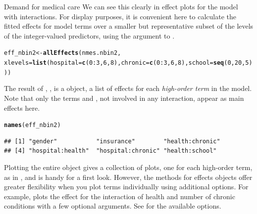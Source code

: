 \documentclass[11pt]{book}\usepackage[]{graphicx}\usepackage[]{color}
\makeatletter
\newcommand{\hlnum}[1]{\textcolor[rgb]{0.686,0.059,0.569}{#1}}%
\newcommand{\hlopt}[1]{\textcolor[rgb]{0,0,0}{#1}}%
\newcommand{\hlstd}[1]{\textcolor[rgb]{0.345,0.345,0.345}{#1}}%
\newcommand{\hlkwb}[1]{\textcolor[rgb]{0.69,0.353,0.396}{#1}}%
\newcommand{\hlkwc}[1]{\textcolor[rgb]{0.333,0.667,0.333}{#1}}%
\newcommand{\hlkwd}[1]{\textcolor[rgb]{0.737,0.353,0.396}{\textbf{#1}}}%
\newenvironment{kframe}{%
 \def\at@end@of@kframe{}%
 \ifinner\ifhmode%
  \def\at@end@of@kframe{\end{minipage}}%
  \begin{minipage}{\columnwidth}%
 \fi\fi%
 \def\FrameCommand##1{\hskip\@totalleftmargin \hskip-\fboxsep
 \colorbox{shadecolor}{##1}\hskip-\fboxsep
     \hskip-\linewidth \hskip-\@totalleftmargin \hskip\columnwidth}%
 \MakeFramed {\advance\hsize-\width
   \@totalleftmargin\z@ \linewidth\hsize
   \@setminipage}}%
 {\par\unskip\endMakeFramed%
 \at@end@of@kframe}
\newenvironment{knitrout}{}{} %
\renewenvironment{knitrout}{\small\renewcommand{\baselinestretch}{.85}}{} %
\makeatother
\begin{document}
\begin{Example}[nmes2a]{Demand for medical care}
We can see this clearly in effect plots for the model  with interactions.
For display purposes,
it is convenient here to calculate the fitted effects for model terms
over a smaller but representative subset of the levels of the
integer-valued predictors, using the  argument to
.

\begin{knitrout}
\color{fgcolor}\begin{kframe}
\begin{alltt}
\hlstd{eff_nbin2} \hlkwb{<-} \hlkwd{allEffects}\hlstd{(nmes.nbin2,}
  \hlkwc{xlevels}\hlstd{=}\hlkwd{list}\hlstd{(}\hlkwc{hospital}\hlstd{=}\hlkwd{c}\hlstd{(}\hlnum{0}\hlopt{:}\hlnum{3}\hlstd{,} \hlnum{6}\hlstd{,} \hlnum{8}\hlstd{),} \hlkwc{chronic}\hlstd{=}\hlkwd{c}\hlstd{(}\hlnum{0}\hlopt{:}\hlnum{3}\hlstd{,} \hlnum{6}\hlstd{,} \hlnum{8}\hlstd{),} \hlkwc{school}\hlstd{=}\hlkwd{seq}\hlstd{(}\hlnum{0}\hlstd{,}\hlnum{20}\hlstd{,}\hlnum{5}\hlstd{)))}
\end{alltt}
\end{kframe}
\end{knitrout}
The result of , , is a  object, a list of effects for each
\emph{high-order term} in the model.  Note that only the terms  and ,
not involved in any interaction, appear as main effects here.
\begin{knitrout}
\color{fgcolor}\begin{kframe}
\begin{alltt}
\hlkwd{names}\hlstd{(eff_nbin2)}
\end{alltt}
\begin{verbatim}
## [1] "gender"           "insurance"        "health:chronic"  
## [4] "hospital:health"  "hospital:chronic" "health:school"
\end{verbatim}
\end{kframe}
\end{knitrout}
Plotting the entire  object gives a collection of plots, one for each high-order term, as in
, and is handy for a first look. However, the  methods for effects
objects offer greater flexibility when you plot terms individually using additional options.
For example,  plots the effect for the interaction of health and number of chronic conditions
with a few optional arguments. See  for the available options.


\end{Example}
\end{document}
